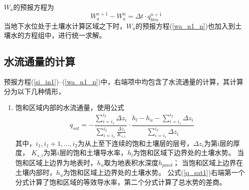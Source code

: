 $W_a$的预报方程为
\begin{equation}\label{wa_n1_n}
W_{a}^{n+1}-W_{a}^{n}=\Delta t \cdot q_{b t m}^{n+1}
\end{equation}
当地下水位处于土壤水计算区域之下时，$W_a$的预报方程(\ref{wa_n1_n})也加入到土壤水的方程组中，进行统一求解。

\subsection{水流通量的计算}
预报方程(\ref{si_in1})--(\ref{wa_n1_n})中，右端项中均包含了水流通量的计算，其计算分为以下几种情形，
\begin{enumerate}
    \item 饱和区域内部的水流通量，使用公式
    \begin{equation}\label{q_sat1}
        q_{sat}=-\frac{\sum_{i=i_{1}}^{i_{2}} \Delta z_{i}}{\sum_{i=i_{1}}^{i_{2}} \frac{\Delta z_{i}}{K_{s, i}}}
         \cdot \frac{h_{l}-h_{u}-\sum_{i=i_{1}}^{i_{2}} \Delta z_{i}}{\sum_{i=i_{1}}^{i_{2}} \Delta z_{i}}
        \end{equation}
        其中，$i_1,i_1+1,…,i_2$为从上至下连续的饱和土壤层的层号，$\Delta z_i$为第i层的厚度，
        $K_{s,i}$为第$i$层的饱和土壤导水率，$h_l$为饱和区域下边界处的土壤水势。
        当饱和区域上边界为地表时，$h_u$取为地表积水深度$h_{pond}$；
        当饱和区域上边界在土壤内部时，$h_u$为饱和区域上边界处的土壤水势。
        公式(\ref{q_sat1})右端第一个分式计算了饱和区域的等效导水率，第二个分式计算了总水势的差商。


\end{enumerate}
